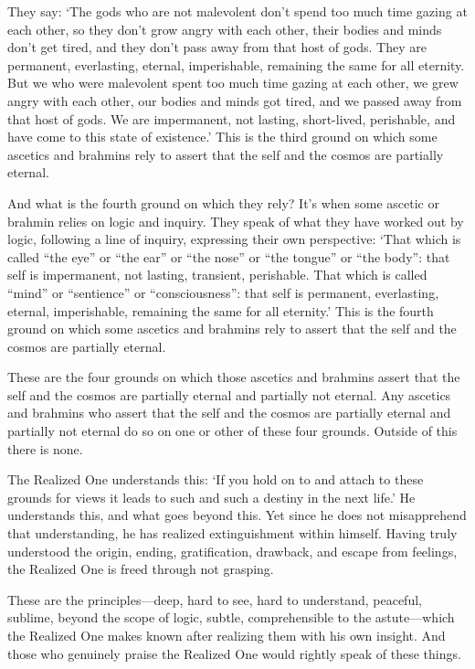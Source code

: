 \documentclass[12pt,openany]{book}%
\begin{document}
They say: ‘The gods who are not malevolent don’t spend too much time gazing at each other, so they don’t grow angry with each other, their bodies and minds don’t get tired, and they don’t pass away from that host of gods. They are permanent, everlasting, eternal, imperishable, remaining the same for all eternity. But we who were malevolent spent too much time gazing at each other, we grew angry with each other, our bodies and minds got tired, and we passed away from that host of gods. We are impermanent, not lasting, short-lived, perishable, and have come to this state of existence.’ This is the third ground on which some ascetics and brahmins rely to assert that the self and the cosmos are partially eternal. 

And what is the fourth ground on which they rely? It’s when some ascetic or brahmin relies on logic and inquiry. They speak of what they have worked out by logic, following a line of inquiry, expressing their own perspective: ‘That which is called “the eye” or “the ear” or “the nose” or “the tongue” or “the body”: that self is impermanent, not lasting, transient, perishable. That which is called “mind” or “sentience” or “consciousness”: that self is permanent, everlasting, eternal, imperishable, remaining the same for all eternity.’ This is the fourth ground on which some ascetics and brahmins rely to assert that the self and the cosmos are partially eternal. 

These are the four grounds on which those ascetics and brahmins assert that the self and the cosmos are partially eternal and partially not eternal. Any ascetics and brahmins who assert that the self and the cosmos are partially eternal and partially not eternal do so on one or other of these four grounds. Outside of this there is none. 

The Realized One understands this: ‘If you hold on to and attach to these grounds for views it leads to such and such a destiny in the next life.’ He understands this, and what goes beyond this. Yet since he does not misapprehend that understanding, he has realized extinguishment within himself. Having truly understood the origin, ending, gratification, drawback, and escape from feelings, the Realized One is freed through not grasping. 

These are the principles—deep, hard to see, hard to understand, peaceful, sublime, beyond the scope of logic, subtle, comprehensible to the astute—which the Realized One makes known after realizing them with his own insight. And those who genuinely praise the Realized One would rightly speak of these things. 
\end{document}

